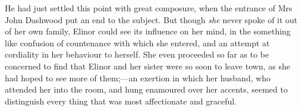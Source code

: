 He had just settled this point with great composure, when the entrance of Mrs John Dashwood put an end to the subject. But though \textit{she} never spoke of it out of her own family, Elinor could see its influence on her mind, in the something like confusion of countenance with which she entered, and an attempt at cordiality in her behaviour to herself. She even proceeded so far as to be concerned to find that Elinor and her sister were so soon to leave town, as she had hoped to see more of them;—an exertion in which her husband, who attended her into the room, and hung enamoured over her accents, seemed to distinguish every thing that was most affectionate and graceful.